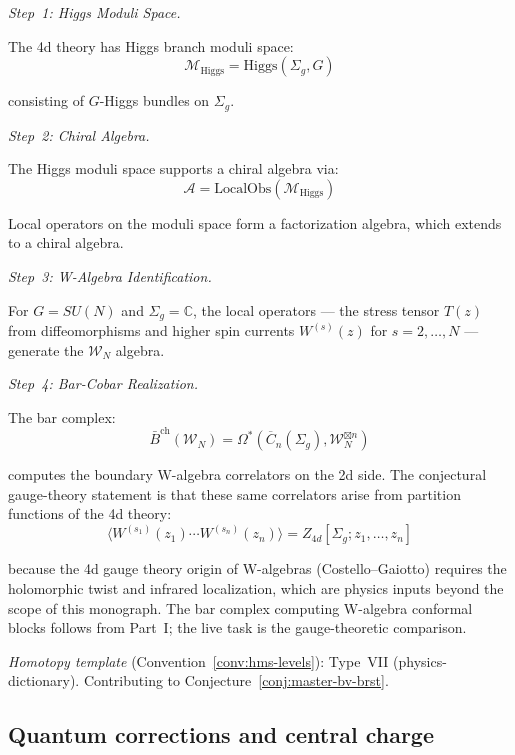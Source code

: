 \begin{evidence}
\emph{Step~1: Higgs Moduli Space.}

The 4d theory has Higgs branch moduli space:
\[\mathcal{M}_{\text{Higgs}} = \text{Higgs}(\Sigma_g, G)\]

consisting of $G$-Higgs bundles on $\Sigma_g$.

\emph{Step~2: Chiral Algebra.}

The Higgs moduli space supports a chiral algebra via:
\[\mathcal{A} = \text{LocalObs}(\mathcal{M}_{\text{Higgs}})\]

Local operators on the moduli space form a factorization algebra, which extends 
to a chiral algebra.

\emph{Step~3: W-Algebra Identification.}

For $G = SU(N)$ and $\Sigma_g = \mathbb{C}$, the local operators --- the stress tensor $T(z)$ from diffeomorphisms and higher spin currents $W^{(s)}(z)$ for $s = 2, \ldots, N$ --- generate the $\mathcal{W}_N$ algebra.

\emph{Step~4: Bar-Cobar Realization.}

The bar complex:
\[\bar{B}^{\text{ch}}(\mathcal{W}_N) = \Omega^*(\overline{C}_n(\Sigma_g), 
\mathcal{W}_N^{\boxtimes n})\]

computes the boundary W-algebra correlators on the 2d side.  The
conjectural gauge-theory statement is that these same correlators arise
from partition functions of the 4d theory:
\[\langle W^{(s_1)}(z_1) \cdots W^{(s_n)}(z_n) \rangle =
Z_{4d}[\Sigma_g; z_1, \ldots, z_n]\]
\end{evidence}

\begin{remark}[Scope]
\ClaimStatusConjectured{} because the 4d gauge theory origin of W-algebras (Costello--Gaiotto) requires the holomorphic twist and infrared localization, which are physics inputs beyond the scope of this monograph.  The bar complex computing W-algebra conformal blocks follows from Part~I; the live task is the gauge-theoretic comparison.

\emph{Homotopy template} (Convention~\ref{conv:hms-levels}): Type~VII (physics-dictionary).  Contributing to Conjecture~\ref{conj:master-bv-brst}.
\end{remark}

\subsection{Quantum corrections and central charge}

